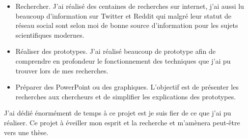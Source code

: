 \begin{itemize}
    \item Rechercher. J'ai réalisé des centaines de recherches sur internet, j'ai aussi lu beaucoup d'information
        sur Twitter et Reddit qui malgré leur statut de réseau social sont selon moi de bonne source d'information
        pour les sujets scientifiques modernes.
    \item Réaliser des prototypes. J'ai réalisé beaucoup de prototype afin de comprendre en profondeur le fonctionnement
        des techniques que j'ai pu trouver lors de mes recherches.
    \item Préparer des PowerPoint ou des graphiques. L'objectif est de présenter les recherches aux chercheurs et de simplifier
        les explications des prototypes.
\end{itemize}

J'ai dédié énormément de temps à ce projet est je suis fier de ce que j'ai pu réaliser. Ce projet à éveiller mon esprit et la recherche
et m'amènera peut-être vers une thèse.
